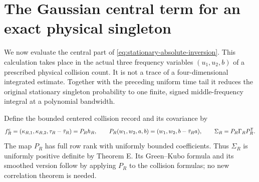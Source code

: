 \section{The Gaussian central term for an exact physical singleton}
\label{sec:stationary-gaussian-complement}
We now evaluate the central part of
\eqref{eq:stationary-absolute-inversion}. This calculation takes place
in the actual three frequency variables $(u_1,u_2,b)$ of a prescribed
physical collision count. It is not a trace of a four-dimensional
integrated estimate. Together with the preceding uniform time tail it
reduces the original stationary singleton probability to one finite,
signed middle-frequency integral at a polynomial bandwidth.

Define the bounded centered collision record and its covariance by
\begin{equation}\label{eq:physical-three-collision-record}
 f^{\rm c}_R=(\kappa_{R,1},\kappa_{R,2},\tau_R-\bar\tau_R)
       =P_Rh_R,\qquad
 P_R(w_1,w_2,a,b)=(w_1,w_2,b-\bar\tau_Ra),\qquad
 \Sigma_R=P_R\Gamma_RP_R^{\mathsf T}.
\end{equation}
The map $P_R$ has full row rank with uniformly bounded coefficients.
Thus $\Sigma_R$ is uniformly positive definite by Theorem E. Its
Green--Kubo formula and its smoothed version follow by applying $P_R$
to the collision formulas; no new correlation theorem is needed.

